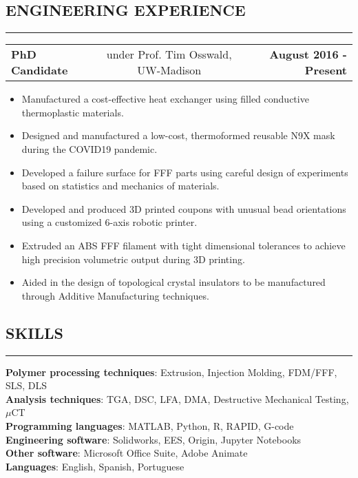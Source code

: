 \documentclass[11pt,letterpaper]{article}
\makeatletter
\newcommand{\headerrow}[3]
{\vspace{0.4em}
\noindent
\begin{tabular*}{\textwidth}{l @{\extracolsep{\fill}} cr}
	\textbf{#1} & %
	#2 &		  %
	\textbf{#3}\\ %
\end{tabular*}}
\makeatother
\begin{document}
\subsection*{ENGINEERING EXPERIENCE}
	\vspace{-0.5em}
	\hrule

	\headerrow
		{PhD Candidate}
		{under Prof. Tim Osswald, UW-Madison}
		{August 2016 - Present}
		
	\begin{itemize}
		\item Manufactured a cost-effective heat exchanger using filled conductive thermoplastic materials.
		\item Designed and manufactured a low-cost, thermoformed reusable N9X mask during the COVID19 pandemic.
		\item Developed a failure surface for FFF parts using careful design of experiments based on statistics and mechanics of materials.
		\item Developed and produced 3D printed coupons with unusual bead orientations using a customized 6-axis robotic printer.
		\item Extruded an ABS FFF filament with tight dimensional tolerances to achieve high precision volumetric output during 3D printing.
		\item Aided in the design of topological crystal insulators to be manufactured through Additive Manufacturing techniques. 
	\end{itemize}

\subsection*{SKILLS}
\vspace{-0.5em}
\hrule
\vspace{0.4em}

\textbf{Polymer processing techniques}: Extrusion, Injection Molding, FDM/FFF, SLS, DLS\\
\textbf{Analysis techniques}: TGA, DSC, LFA, DMA, Destructive Mechanical Testing, $\mu$CT\\
\textbf{Programming languages}: MATLAB, Python, R, RAPID, G-code\\
\textbf{Engineering software}: Solidworks, EES, Origin, Jupyter Notebooks\\
\textbf{Other software}: Microsoft Office Suite, Adobe Animate\\
\textbf{Languages}: English, Spanish, Portuguese\\
\end{document}
